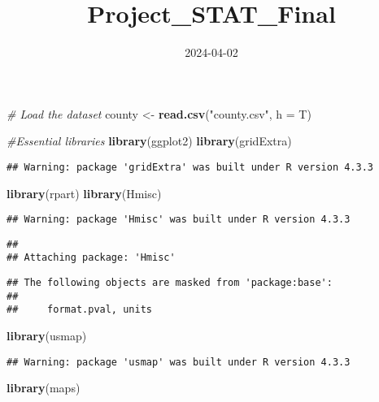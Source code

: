\documentclass[
]{article}
\title{Project\_STAT\_Final}
\author{}
\date{\vspace{-2.5em}2024-04-02}
\newenvironment{Shaded}{\begin{snugshade}}{\end{snugshade}}
\newcommand{\AttributeTok}[1]{\textcolor[rgb]{0.13,0.29,0.53}{#1}}
\newcommand{\CommentTok}[1]{\textcolor[rgb]{0.56,0.35,0.01}{\textit{#1}}}
\newcommand{\FunctionTok}[1]{\textcolor[rgb]{0.13,0.29,0.53}{\textbf{#1}}}
\newcommand{\NormalTok}[1]{#1}
\newcommand{\OtherTok}[1]{\textcolor[rgb]{0.56,0.35,0.01}{#1}}
\newcommand{\StringTok}[1]{\textcolor[rgb]{0.31,0.60,0.02}{#1}}
\begin{document}
\maketitle

\begin{Shaded}
\begin{Highlighting}[]
\CommentTok{\# Load the dataset}
\NormalTok{county }\OtherTok{\textless{}{-}} \FunctionTok{read.csv}\NormalTok{(}\StringTok{"county.csv"}\NormalTok{, }\AttributeTok{h =}\NormalTok{ T)}


\CommentTok{\#Essential libraries}
\FunctionTok{library}\NormalTok{(ggplot2)}
\FunctionTok{library}\NormalTok{(gridExtra)}
\end{Highlighting}
\end{Shaded}

\begin{verbatim}
## Warning: package 'gridExtra' was built under R version 4.3.3
\end{verbatim}

\begin{Shaded}
\begin{Highlighting}[]
\FunctionTok{library}\NormalTok{(rpart)}
\FunctionTok{library}\NormalTok{(Hmisc)}
\end{Highlighting}
\end{Shaded}

\begin{verbatim}
## Warning: package 'Hmisc' was built under R version 4.3.3
\end{verbatim}

\begin{verbatim}
## 
## Attaching package: 'Hmisc'
\end{verbatim}

\begin{verbatim}
## The following objects are masked from 'package:base':
## 
##     format.pval, units
\end{verbatim}

\begin{Shaded}
\begin{Highlighting}[]
\FunctionTok{library}\NormalTok{(usmap)}
\end{Highlighting}
\end{Shaded}

\begin{verbatim}
## Warning: package 'usmap' was built under R version 4.3.3
\end{verbatim}

\begin{Shaded}
\begin{Highlighting}[]
\FunctionTok{library}\NormalTok{(maps)}
\end{Highlighting}
\end{Shaded}
\end{document}
